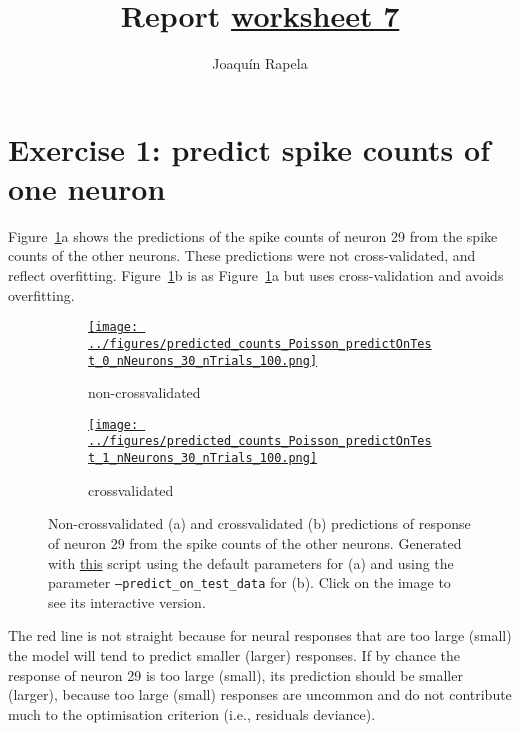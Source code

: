 \documentclass[12pt]{article}
\title{Report
\href{https://drive.google.com/file/d/1hCki0GsbQYhMEsLD9tMoxMU1fSerNEZR/view}{worksheet 7}}
\author{Joaqu\'{i}n Rapela}
\def\figWidth{4.5in}
\begin{document}
\maketitle

\section*{Exercise 1: predict spike counts of one neuron}

Figure~\ref{fig:predictions_one_neuron}a shows the predictions of the spike
counts of neuron 29 from the spike counts of the other neurons. These
predictions were not cross-validated, and reflect overfitting.
%
Figure~\ref{fig:predictions_one_neuron}b is as
Figure~\ref{fig:predictions_one_neuron}a but uses cross-validation and avoids
overfitting.

\begin{figure}[H]
    \centering
    \begin{subfigure}{\textwidth}
	        \centering
        \href{https://www.gatsby.ucl.ac.uk/~rapela/neuroinformatics/2023/ws7/figures/predicted_counts_Poisson_predictOnTest_0_nNeurons_30_nTrials_100.html}{\texttt{[image: ../figures/predicted\_counts\_Poisson\_predictOnTest\_0\_nNeurons\_30\_nTrials\_100.png]}}
	        \caption{non-crossvalidated}
    \end{subfigure}
    \linebreak
    \begin{subfigure}{\textwidth}
        \centering
        \href{https://www.gatsby.ucl.ac.uk/~rapela/neuroinformatics/2023/ws7/figures/predicted_counts_Poisson_predictOnTest_1_nNeurons_30_nTrials_100.html}{\texttt{[image: ../figures/predicted\_counts\_Poisson\_predictOnTest\_1\_nNeurons\_30\_nTrials\_100.png]}}
	        \caption{crossvalidated}
    \end{subfigure}

    \caption{Non-crossvalidated (a) and crossvalidated (b) predictions of
	response of neuron 29 from the spike counts of the other neurons.
	Generated with
	\href{https://github.com/joacorapela/neuroinformatics23/blob/master/worksheets/ws7/mySolution/code/scripts/doComputeOneSetOfPredictions.py}{this}
	script using the default parameters for (a) and using the parameter
	\texttt{--predict\_on\_test\_data} for (b). Click on the image to see its
	interactive version.}

    \label{fig:predictions_one_neuron}
\end{figure}

The red line is not straight because for neural responses that are too large
(small) the model will tend to predict smaller (larger) responses. If by
chance the response of neuron 29 is too large (small), its prediction should be
smaller (larger), because too large (small) responses are uncommon and do not
contribute much to the optimisation criterion (i.e., residuals deviance).
\end{document}
